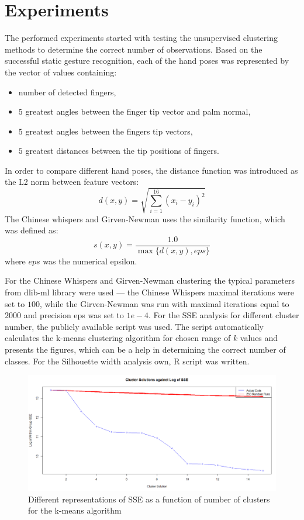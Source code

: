 \section{Experiments}


The performed experiments started with testing the unsupervised clustering methods to determine the correct number of observations.
Based on the successful static gesture recognition, each of the hand poses was represented by the vector of values containing:
\begin{itemize}
\item number of detected fingers,
\item $5$ greatest angles between the finger tip vector and palm normal,
\item $5$ greatest angles between the fingers tip vectors,
\item $5$ greatest distances between the tip positions of fingers.
\end{itemize}
In order to compare different hand poses, the distance function was introduced as the L2 norm between feature vectors:
\begin{equation}
d(x,y) = \sqrt{ \sum_{i=1}^{16} (x_i - y_i)^2 }
\end{equation}
The Chinese whispers and Girven-Newman uses the similarity function, which was defined as: 
\begin{equation}
s(x,y) = \frac{1.0}{ \max{\{d(x,y), eps\}}}
\end{equation}
where $eps$ was the numerical epsilon.

For the Chinese Whispers and Girven-Newman clustering the typical parameters from dlib-ml library were used --- the Chinese Whispers maximal iterations were set to $100$, while the Girven-Newman was run with maximal iterations equal to $2000$ and precision eps was set to $1e-4$.
For the SSE analysis for different cluster number, the publicly available script was used\cite{SSE}. 
The script automatically calculates the k-means clustering algorithm for chosen range of $k$ values and presents the figures, which can be a help in determining the correct number of classes.
For the Silhouette width analysis own, R script was written.



\begin{figure}[htp!]
\centering
 \includegraphics[width=1.0\columnwidth]{figures/SSE1.png}
 \caption{Different representations of SSE as a function of number of clusters for the k-means algorithm}
 \label{dynamicSSE}
\end{figure}

